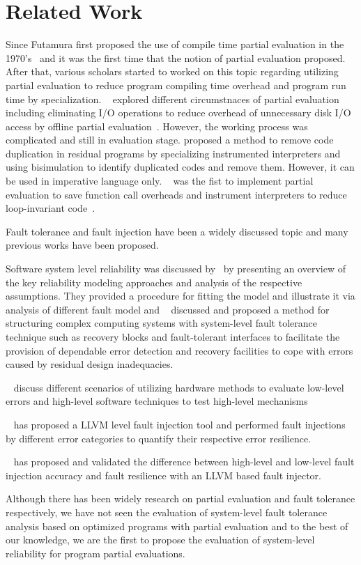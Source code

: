 \section{Related Work}
\label{sec:related-work}

Since Futamura first proposed the use of compile time partial evaluation in the 1970’s~\cite{Futamura} and it was the first time that the notion of partial evaluation proposed. After that, various scholars started to worked on this topic regarding utilizing partial evaluation to reduce program compiling time overhead and program run time by specialization. 
~\cite{Smowton} explored different circumstnaces of partial evaluation including eliminating I/O operations to reduce overhead of unnecessary disk I/O access by offline partial evaluation~\cite{Smowton}.
However, the working process was complicated and still in evaluation stage.
\cite{Debois} proposed a method to remove code duplication in residual programs by specializing instrumented interpreters and using bisimulation to identify duplicated codes and remove them. However, it can be used in imperative language only.
~\cite{Jones1996} was the fist to implement partial evaluation to save function call overheads and instrument interpreters to reduce loop-invariant code~\cite{Jones1993}.

Fault tolerance and fault injection have been a widely discussed topic and many previous works have been proposed.

Software system level reliability was discussed by~\cite{Softwarereliability} by presenting an overview of the key reliability modeling approaches and analysis of the respective assumptions. They provided a procedure for fitting the model and illustrate it via analysis of different fault model and ~\cite{Randell} discussed and proposed a method for structuring complex computing systems with system-level fault tolerance technique such as recovery blocks and fault-tolerant interfaces to facilitate the provision of dependable error detection and recovery facilities to cope with errors caused by residual design inadequacies. 

~\cite{Faultinjection} discuss different scenarios of utilizing hardware methods to evaluate low-level errors and high-level software techniques to test high-level mechanisms 

~\cite{luqining} has proposed a LLVM level fault injection tool and performed fault injections by different error categories to quantify their respective error resilience.

~\cite{Weijiesheng} has proposed and validated the difference between high-level and low-level fault injection accuracy and fault resilience with an LLVM based fault injector. 

Although there has been widely research on partial evaluation and fault tolerance respectively, we have not seen the evaluation of system-level fault tolerance analysis based on optimized programs with partial evaluation and to the best of our knowledge, we are the first to propose the evaluation of system-level reliability for program partial evaluations.  
